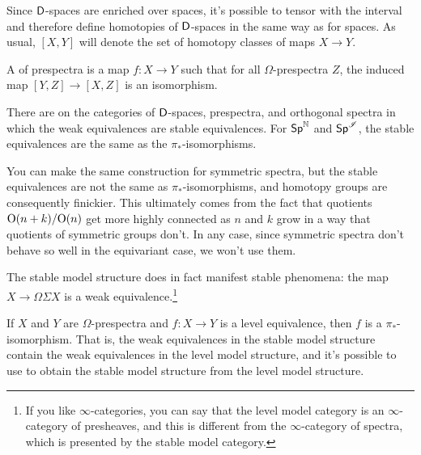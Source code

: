 Since $\mathsf D$-spaces are enriched over spaces, it's possible to tensor with the interval and therefore define
homotopies of $\mathsf D$-spaces in the same way as for spaces. As usual, $[X,Y]$ will denote the set of homotopy classes
of maps $X\to Y$.
\begin{defn}
\label{stable_equivalence}
A  of prespectra is a map $f\colon X\to Y$ such that for all $\Omega$-prespectra $Z$, the
induced map $[Y,Z]\to[X,Z]$ is an isomorphism.
\end{defn}
\begin{thm}
There are  on the categories of $\mathsf D$-spaces, prespectra, and orthogonal spectra in
which the weak equivalences are stable equivalences. For $\mathsf{Sp}^\mathbb N$ and $\mathsf{Sp}^\mathscr I$, the stable equivalences are the
same as the $\pi_*$-isomorphisms.
\end{thm}
\begin{rem}
You can make the same construction for symmetric spectra, but the stable equivalences are not the same as
$\pi_*$-isomorphisms, and homotopy groups are consequently finickier. This ultimately comes from the fact that
quotients $\mathrm O(n+k)/\mathrm O(n)$ get more highly connected as $n$ and $k$ grow in a way that quotients of symmetric groups
don't. In any case, since symmetric spectra don't behave so well in the equivariant case, we won't use them.
\end{rem}
The stable model structure does in fact manifest stable phenomena: the map $X\to\Omega\Sigma X$ is a weak
equivalence.\footnote{If you like $\infty$-categories, you can say that the level model category is an
$\infty$-category of presheaves, and this is different from the $\infty$-category of spectra, which is presented by
the stable model category.}

If $X$ and $Y$ are $\Omega$-prespectra and $f\colon X\to Y$ is a level equivalence, then $f$ is a
$\pi_*$-isomorphism. That is, the weak equivalences in the stable model structure contain the weak equivalences in
the level model structure, and it's possible to use  to obtain the stable model
structure from the level model structure.

